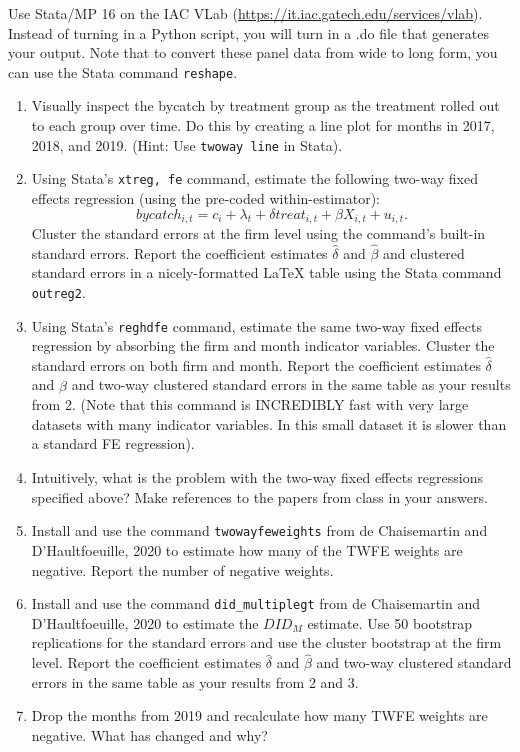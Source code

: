 \documentclass{article}
\begin{document}
Use Stata/MP 16 on the IAC VLab (\url{https://it.iac.gatech.edu/services/vlab}).  Instead of turning in a Python script, you will turn in a .do file that generates your output.  Note that to convert these panel data from wide to long form, you can use the Stata command \verb!reshape!.

\begin{enumerate}
    \item Visually inspect the bycatch by treatment group as the treatment rolled out to each group over time.  Do this by creating a line plot for months in 2017, 2018, and 2019.  (Hint: Use \verb!twoway line! in Stata).
    \item Using Stata's \verb!xtreg, fe! command, estimate the following two-way fixed effects regression (using the pre-coded within-estimator): $$bycatch_{i,t} = c_i + \lambda_t + \delta treat_{i,t} + \beta X_{i,t} + u_{i,t}.$$  Cluster the standard errors at the firm level using the command's built-in standard errors.  Report the coefficient estimates \(\hat{\delta}\) and \(\hat{\beta}\) and clustered standard errors in a nicely-formatted LaTeX table using the Stata command \verb!outreg2!.
    \item Using Stata's \verb!reghdfe! command, estimate the same two-way fixed effects regression by absorbing the firm and month indicator variables.  Cluster the standard errors on both firm and month.  Report the coefficient estimates \(\hat{\delta}\) and \(\hat{\beta}\) and two-way clustered standard errors in the same table as your results from 2. (Note that this command is INCREDIBLY fast with very large datasets with many indicator variables.  In this small dataset it is slower than a standard FE regression).
    \item Intuitively, what is the problem with the two-way fixed effects regressions specified above?  Make references to the papers from class in your answers.
    \item Install and use the command \verb!twowayfeweights! from de Chaisemartin and D'Haultfoeuille, 2020 to estimate how many of the TWFE weights are negative.  Report the number of negative weights.
    \item Install and use the command \verb!did_multiplegt! from de Chaisemartin and D'Haultfoeuille, 2020 to estimate the \(DID_M\) estimate.  Use 50 bootstrap replications for the standard errors and use the cluster bootstrap at the firm level.   Report the coefficient estimates \(\hat{\delta}\) and \(\hat{\beta}\) and two-way clustered standard errors in the same table as your results from 2 and 3.
    \item Drop the months from 2019 and recalculate how many TWFE weights are negative.  What has changed and why?
\end{enumerate}
\end{document}

